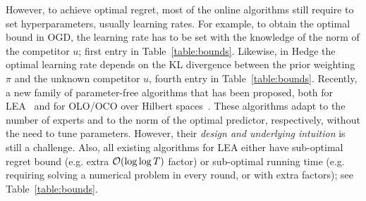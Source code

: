 However, to achieve optimal regret, most of the online algorithms still require
to set hyperparameters, usually learning rates.  For example, to obtain the
optimal bound in \ac{OGD}, the learning rate has to be set with the knowledge
of the norm of the competitor $u$; first entry in Table~\ref{table:bounds}.
Likewise, in Hedge the optimal learning rate depends on the KL divergence
between the prior weighting $\pi$ and the unknown competitor $u$, fourth entry
in Table~\ref{table:bounds}.  Recently, a new family of parameter-free
algorithms that has been proposed, both for
\ac{LEA}~\cite{Chaudhuri-Freund-Hsu-2009, Chernov-Vovk-2010, Luo-Schapire-2014,
Luo-Schapire-2015, Koolen-van-Erven-2015, Foster-Rakhlin-Sridharan-2015} and
for \ac{OLO}/\ac{OCO} over Hilbert spaces~\cite{Streeter-McMahan-2012,
Orabona-2013, McMahan-Abernethy-2013, McMahan-Orabona-2014, Orabona-2014}.
These algorithms adapt to the number of experts and to the norm of the optimal
predictor, respectively, without the need to tune parameters. However, their
\emph{design and underlying intuition} is still a challenge.
Also, all existing algorithms for LEA either have sub-optimal regret bound
(e.g. extra $\mathcal{O}(\log \log T)$ factor) or sub-optimal running time (e.g.
requiring solving a numerical problem in every round, or with extra factors);
see Table~\ref{table:bounds}.

